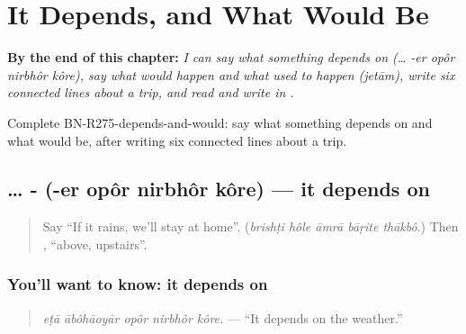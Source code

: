 
\chapter{It Depends, and What Would Be}
\label{ch:bn-it-depends-and-what-would-be}

\begin{chapteropening}
\textbf{By the end of this chapter:} \emph{I can say what something depends on (… -er opôr nirbhôr kôre), say what would happen and what used to happen (jetām), write six connected lines about a trip, and read and write  in .}

Complete BN-R275-depends-and-would: say what something depends on and what would be, after writing six connected lines about a trip.
\end{chapteropening}

\section[\texorpdfstring{… -\bn{এর} \bn{ওপর} \bn{নির্ভর} … (… -er opôr …)}{… -এর ওপর নির্ভর … (… -er opôr …)}]{… -    (-er opôr nirbhôr kôre) — it depends on}

\label{lesson:BN-C275-nirbhor-kore}



\begin{quote}
Say \textquotedblleft{}If it rains, we'll stay at home\textquotedblright{}. (\emph{brishṭi hôle āmrā bāṛite thākbô}.) Then \textbf{}, \textquotedblleft{}above, upstairs\textquotedblright{}.
\end{quote}

\subsection*{You'll want to know: it depends on}
\begin{quote}
\textbf{    }
\end{quote}

\begin{quote}
\emph{eṭā ābôhāoyār opôr nirbhôr kôre.} — \textquotedblleft{}It depends on the weather.\textquotedblright{}
\end{quote}

